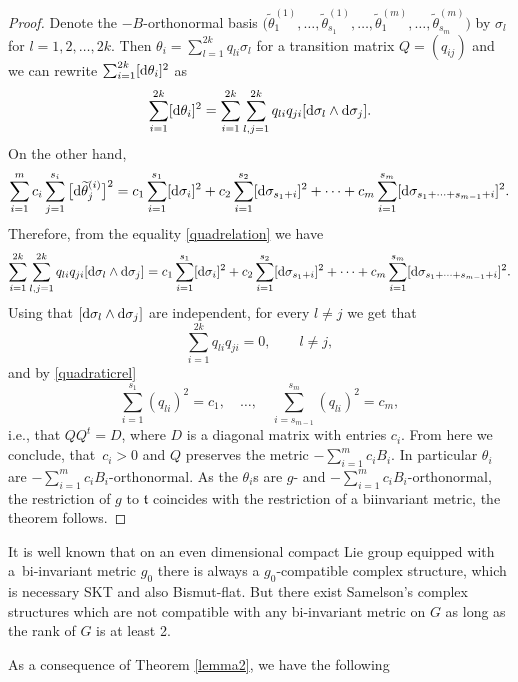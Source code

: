\documentclass[pdftex]{sigma}
\numberwithin{equation}{section}
\begin{document}
\begin{proof}
Denote the $-B$-orthonormal basis $\big(\widetilde{\theta}_1^{(1)}, \dots, \widetilde{\theta}_{s_1}^{(1)}, \dots, \widetilde{\theta}_1^{(m)}, \dots, \widetilde{\theta}_{s_m}^{(m)}\big)$ by $\sigma_l$ for $l=1,2,\dots ,2k$. Then $\theta_i = \sum_{l=1}^{2k} q_{li}\sigma_l$ for a transition matrix $Q = (q_{ij})$
and we can rewrite $\sum_{i=1}^{2k} [{\rm d}\theta_i]^2$ as
\[
\sum_{i=1}^{2k} [{\rm d}\theta_i]^2 = \sum_{i = 1}^{2k} \sum_{l,j =1}^{2k} q_{li} q_{ji} [{\rm d}\sigma_l \wedge {\rm d} \sigma_j].
\]
 On the other hand,
\[
 \sum_{i=1}^m c_i\sum_{j=1}^{s_i} \big[{\rm d}\widetilde{\theta}^{(i)}_j\big]^2 = c_1 \sum_{i =1}^{s_1} [{\rm d} \sigma_i]^2 + c_2 \sum_{i =1}^{s_2} [{\rm d} \sigma_{s_1 +i}]^2 + \dots + c_m \sum_{i =1}^{s_m} [{\rm d} \sigma_{s_1 + \dots + s_{m-1} + i} ]^2.
\]
Therefore, from the equality \eqref{quadrelation} we have
\[
 \sum_{i = 1}^{2k} \sum_{l,j =1}^{2k} q_{li} q_{ji} [{\rm d} \sigma_l \wedge {\rm d} \sigma_j] = c_1 \sum_{i =1}^{s_1} [{\rm d} \sigma_i]^2 + c_2 \sum_{i =1}^{s_2} [{\rm d} \sigma_{s_1 +i}]^2 + \dots + c_m \sum_{i =1}^{s_m} [{\rm d} \sigma_{s_1 + \dots + s_{m-1} + i} ]^2.
\]
Using that $[{\rm d}\sigma_l\wedge {\rm d}\sigma_j]$ are independent, for every $l\neq j$ we get that
\[
\sum_{i = 1}^{2k} q_{li} q_{ji} =0, \qquad l \neq j,
\]
and by \eqref{quadraticrel}
\[
\sum_{i =1}^{s_1} (q_{li})^2 = c_1, \quad \dots, \quad \sum_{i =s_{m-1}}^{s_m} (q_{li})^2 = c_m,
\]
i.e., that $QQ^t= D$, where $D$ is a diagonal matrix with entries $c_i$. From here we conclude, that~$c_i > 0$ and $Q$ preserves the metric $-\sum_{i = 1}^m c_i B_i$. In particular $\theta_i$ are $-\sum_{i=1}^m c_i B_i$-or\-thonor\-mal. As the $\theta_i$s are $g$- and $-\sum_{i=1}^m c_i B_i$-orthonormal, the restriction of $g$ to $\mathfrak t$ coincides with the restriction of a biinvariant metric, the theorem follows.
\end{proof}


\begin{Remark} It is well known that on an even dimensional compact Lie group equipped with a~bi-invariant metric $g_0$ there is always a $g_0$-compatible complex structure, which is necessary SKT and also Bismut-flat. But there exist Samelson's complex structures which are not compatible with any bi-invariant metric on $G$ as long as the rank of $G$ is at least 2.
\end{Remark}

As a consequence of Theorem \ref{lemma2}, we have the following
\end{document}
